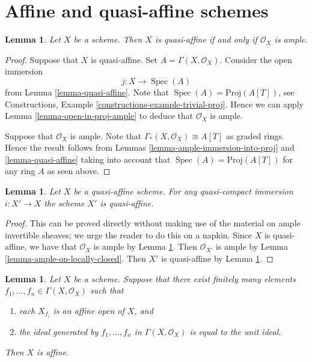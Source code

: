 \documentclass{stacks-project}
\theoremstyle{plain}
\newtheorem{lemma}[subsection]{Lemma}
\theoremstyle{definition}
\theoremstyle{remark}
\numberwithin{equation}{subsection}
\def\Spec{\mathop{\mathrm{Spec}}}
\begin{document}
\section{Affine and quasi-affine schemes}
\label{section-affine-quasi-affine}

\begin{lemma}
\label{lemma-quasi-affine-O-ample}
Let $X$ be a scheme.
Then $X$ is quasi-affine if and only if $\mathcal{O}_X$ is ample.
\end{lemma}

\begin{proof}
Suppose that $X$ is quasi-affine. Set $A = \Gamma(X, \mathcal{O}_X)$.
Consider the open immersion
$$
j : X \longrightarrow \Spec(A)
$$
from Lemma \ref{lemma-quasi-affine}. Note that
$\Spec(A) = \text{Proj}(A[T])$, see
Constructions, Example \ref{constructions-example-trivial-proj}.
Hence we can apply Lemma \ref{lemma-open-in-proj-ample}
to deduce that $\mathcal{O}_X$ is ample.

\medskip\noindent
Suppose that $\mathcal{O}_X$ is ample.
Note that $\Gamma_*(X, \mathcal{O}_X) \cong A[T]$
as graded rings. Hence the result follows from Lemmas
\ref{lemma-ample-immersion-into-proj} and \ref{lemma-quasi-affine}
taking into account that
$\Spec(A) = \text{Proj}(A[T])$ for any ring $A$
as seen above.
\end{proof}

\begin{lemma}
\label{lemma-quasi-affine-locally-closed}
Let $X$ be a quasi-affine scheme. For any quasi-compact immersion
$i : X' \to X$ the scheme $X'$ is quasi-affine.
\end{lemma}

\begin{proof}
This can be proved directly without making use of the material on
ample invertible sheaves; we urge the reader to do this on a napkin.
Since $X$ is quasi-affine, we have that $\mathcal{O}_X$ is ample by
Lemma \ref{lemma-quasi-affine-O-ample}.
Then $\mathcal{O}_{X'}$ is ample by
Lemma \ref{lemma-ample-on-locally-closed}. Then $X'$ is quasi-affine by
Lemma \ref{lemma-quasi-affine-O-ample}.
\end{proof}

\begin{lemma}
\label{lemma-characterize-affine}
Let $X$ be a scheme. Suppose that there exist finitely many elements
$f_1, \ldots, f_n \in \Gamma(X, \mathcal{O}_X)$ such that
\begin{enumerate}
\item each $X_{f_i}$ is an affine open of $X$, and
\item the ideal generated by $f_1, \ldots, f_n$ in
$\Gamma(X, \mathcal{O}_X)$ is equal to the unit ideal.
\end{enumerate}
Then $X$ is affine.
\end{lemma}
\end{document}
